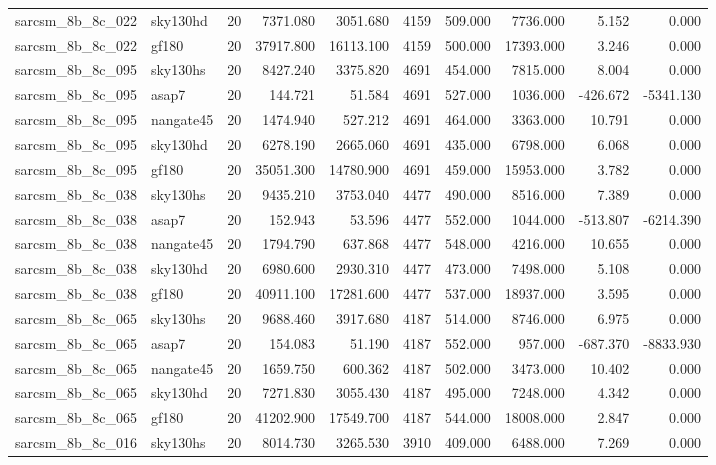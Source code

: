 \begin{longtable}{llrrrrrrrr}
sarcsm\_8b\_8c\_022 & sky130hd & 20 & 7371.080 & 3051.680 & 4159 & 509.000 & 7736.000 & 5.152 & 0.000 \\
sarcsm\_8b\_8c\_022 & gf180 & 20 & 37917.800 & 16113.100 & 4159 & 500.000 & 17393.000 & 3.246 & 0.000 \\
sarcsm\_8b\_8c\_095 & sky130hs & 20 & 8427.240 & 3375.820 & 4691 & 454.000 & 7815.000 & 8.004 & 0.000 \\
sarcsm\_8b\_8c\_095 & asap7 & 20 & 144.721 & 51.584 & 4691 & 527.000 & 1036.000 & -426.672 & -5341.130 \\
sarcsm\_8b\_8c\_095 & nangate45 & 20 & 1474.940 & 527.212 & 4691 & 464.000 & 3363.000 & 10.791 & 0.000 \\
sarcsm\_8b\_8c\_095 & sky130hd & 20 & 6278.190 & 2665.060 & 4691 & 435.000 & 6798.000 & 6.068 & 0.000 \\
sarcsm\_8b\_8c\_095 & gf180 & 20 & 35051.300 & 14780.900 & 4691 & 459.000 & 15953.000 & 3.782 & 0.000 \\
sarcsm\_8b\_8c\_038 & sky130hs & 20 & 9435.210 & 3753.040 & 4477 & 490.000 & 8516.000 & 7.389 & 0.000 \\
sarcsm\_8b\_8c\_038 & asap7 & 20 & 152.943 & 53.596 & 4477 & 552.000 & 1044.000 & -513.807 & -6214.390 \\
sarcsm\_8b\_8c\_038 & nangate45 & 20 & 1794.790 & 637.868 & 4477 & 548.000 & 4216.000 & 10.655 & 0.000 \\
sarcsm\_8b\_8c\_038 & sky130hd & 20 & 6980.600 & 2930.310 & 4477 & 473.000 & 7498.000 & 5.108 & 0.000 \\
sarcsm\_8b\_8c\_038 & gf180 & 20 & 40911.100 & 17281.600 & 4477 & 537.000 & 18937.000 & 3.595 & 0.000 \\
sarcsm\_8b\_8c\_065 & sky130hs & 20 & 9688.460 & 3917.680 & 4187 & 514.000 & 8746.000 & 6.975 & 0.000 \\
sarcsm\_8b\_8c\_065 & asap7 & 20 & 154.083 & 51.190 & 4187 & 552.000 & 957.000 & -687.370 & -8833.930 \\
sarcsm\_8b\_8c\_065 & nangate45 & 20 & 1659.750 & 600.362 & 4187 & 502.000 & 3473.000 & 10.402 & 0.000 \\
sarcsm\_8b\_8c\_065 & sky130hd & 20 & 7271.830 & 3055.430 & 4187 & 495.000 & 7248.000 & 4.342 & 0.000 \\
sarcsm\_8b\_8c\_065 & gf180 & 20 & 41202.900 & 17549.700 & 4187 & 544.000 & 18008.000 & 2.847 & 0.000 \\
sarcsm\_8b\_8c\_016 & sky130hs & 20 & 8014.730 & 3265.530 & 3910 & 409.000 & 6488.000 & 7.269 & 0.000 \\

\end{longtable}
